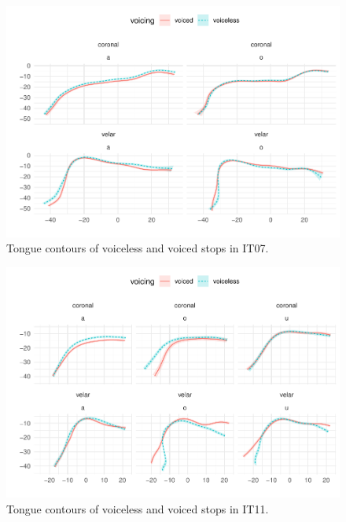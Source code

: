 \documentclass[11pt,]{article}
\begin{document}
\begin{figure}

{\centering \includegraphics[width=.8\textwidth]{2018-polar-gam_files/figure-latex/Figure10} 

}

\caption{Tongue contours of voiceless and voiced stops in IT07.}\label{f:Figure10}
\end{figure}

\begin{figure}

{\centering \includegraphics[width=.8\textwidth]{2018-polar-gam_files/figure-latex/Figure11} 

}

\caption{Tongue contours of voiceless and voiced stops in IT11.}\label{f:Figure11}
\end{figure}
\end{document}
